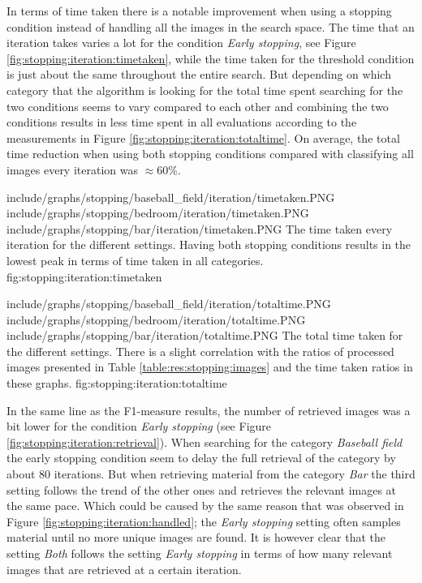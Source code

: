 In terms of time taken there is a notable improvement when using a stopping condition instead of handling all the images in the search space. The time that an iteration takes varies a lot for the condition \emph{Early stopping}, see Figure \ref{fig:stopping:iteration:timetaken}, while the time taken for the threshold condition is just about the same throughout the entire search. But depending on which category that the algorithm is looking for the total time spent searching for the two conditions seems to vary compared to each other and combining the two conditions results in less time spent in all evaluations according to the measurements in Figure \ref{fig:stopping:iteration:totaltime}. On average, the total time reduction when using both stopping conditions compared with classifying all images every iteration was $\approx60\%$. 

\tripfigurenear
{include/graphs/stopping/baseball_field/iteration/timetaken.PNG}
{include/graphs/stopping/bedroom/iteration/timetaken.PNG}
{include/graphs/stopping/bar/iteration/timetaken.PNG}
{The time taken every iteration for the different settings. Having both stopping conditions results in the lowest peak in terms of time taken in all categories.}
{fig:stopping:iteration:timetaken}

\tripfigurenear
{include/graphs/stopping/baseball_field/iteration/totaltime.PNG}
{include/graphs/stopping/bedroom/iteration/totaltime.PNG}
{include/graphs/stopping/bar/iteration/totaltime.PNG}
{The total time taken for the different settings. There is a slight correlation with the ratios of processed images presented in Table \ref{table:res:stopping:images} and the time taken ratios in these graphs.}
{fig:stopping:iteration:totaltime}

In the same line as the F1-measure results, the number of retrieved images was a bit lower for the condition \emph{Early stopping} (see Figure \ref{fig:stopping:iteration:retrieval}). 
When searching for the category \emph{Baseball field} the early stopping condition seem to delay the full retrieval of the category by about 80 iterations. But when retrieving material from the category \emph{Bar} the third setting follows the trend of the other ones and retrieves the relevant images at the same pace. Which could be caused by the same reason that was observed in Figure \ref{fig:stopping:iteration:handled}; the \emph{Early stopping} setting often samples material until no more unique images are found. It is however clear that the setting \emph{Both} follows the setting \emph{Early stopping} in terms of how many relevant images that are retrieved at a certain iteration. 


